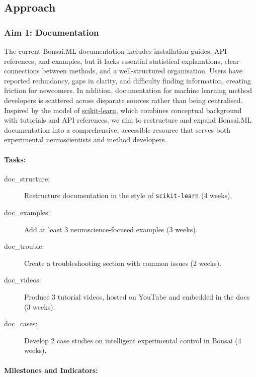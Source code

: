 
\subsection{Approach}

\subsubsection{Aim 1: Documentation}

The current Bonsai.ML documentation includes installation guides, API
references, and examples, but it lacks essential statistical explanations,
clear connections between methods, and a well-structured organisation. Users
have reported redundancy, gaps in clarity, and difficulty finding information,
creating friction for newcomers. In addition, documentation for machine
learning method developers is scattered across disparate sources rather than
being centralised. Inspired by the model of
\href{https://scikit-learn.org/}{scikit-learn}, which combines conceptual
background with tutorials and API references, we aim to restructure and expand
Bonsai.ML documentation into a comprehensive, accessible resource that serves
both experimental neuroscientists and method developers.

\paragraph{Tasks:}  

\begin{description}
    \item[doc\_structure:] Restructure documentation in the style of \texttt{scikit-learn} (4 weeks).  
    \item[doc\_examples:] Add at least 3 neuroscience-focused examples (3 weeks).  
    \item[doc\_trouble:] Create a troubleshooting section with common issues (2 weeks).  
    \item[doc\_videos:] Produce 3 tutorial videos, hosted on YouTube and embedded in the docs (3 weeks).  
    \item[doc\_cases:] Develop 2 case studies on intelligent experimental control in Bonsai (4 weeks).  
\end{description}  

\paragraph{Milestones and Indicators:}  

